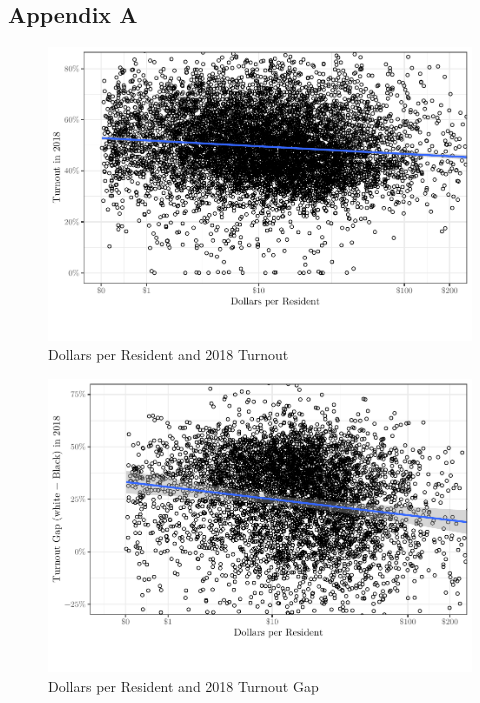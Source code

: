 \documentclass[
  12pt,
]{article}
\begin{document}
\newpage
{}

\hypertarget{appendix-a}{%
\subsection*{Appendix A}\label{appendix-a}}

\begin{figure}[H]

{\centering \includegraphics[height=0.4\textheight]{fees_fines_to_files/figure-latex/figures-side-1} 

}

\caption{\label{fig:to}Dollars per Resident and 2018 Turnout}\label{fig:figures-side}
\end{figure}

\begin{figure}[H]

{\centering \includegraphics[height=0.4\textheight]{fees_fines_to_files/figure-latex/unnamed-chunk-1-1} 

}

\caption{\label{fig:to-gap}Dollars per Resident and 2018 Turnout Gap}\label{fig:unnamed-chunk-1}
\end{figure}

\begin{singlespace}

\end{singlespace}
\end{document}
